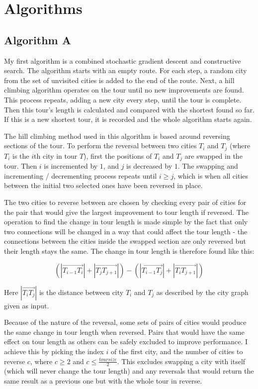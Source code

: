 \documentclass[a4paper,11pt]{article}
\begin{document}
\section{Algorithms}
\subsection{Algorithm A}
My first algorithm is a combined stochastic gradient descent and constructive
search. The algorithm starts with an empty route. For each step, a random city
from the set of unvisited cities is added to the end of the route. Next, a
hill climbing algorithm operates on the tour until no new improvements are
found. This process repeats, adding a new city every step, until the tour is
complete. Then this tour's length is calculated and compared with the shortest
found so far. If this is a new shortest tour, it is recorded and the whole
algorithm starts again.

The hill climbing method used in this algorithm is based around reversing
sections of the tour. To perform the reversal between two cities $T_i$ and
$T_j$ (where $T_i$ is the $i$th city in tour $T$), first the positions of $T_i$
and $T_j$ are swapped in the tour. Then $i$ is incremented by $1$, and $j$ is
decreased by $1$. The swapping and incrementing / decrementing process repeats
until $i \ge j$, which is when all cities between the initial two selected ones
have been reversed in place.

The two cities to reverse between are chosen by checking every pair of cities
for the pair that would give the largest improvement to tour length if
reversed. The operation to find the change in tour length is made simple by the
fact that only two connections will be changed in a way that could affect the
tour length - the connections between the cities inside the swapped section are
only reversed but their length stays the same. The change in tour length is
therefore found like this:

$$(|\overrightarrow{{T_{i-1}}{T_i}}|
+ |\overrightarrow{{T_j}{T_{j+1}}}|)
- (|\overrightarrow{{T_{i-1}}{T_j}}|
+ |\overrightarrow{{T_i}{T_{j+1}}}|)$$

\noindent
Here $|\overrightarrow{{T_i}{T_j}}|$ is the distance between city $T_i$ and
$T_j$ as described by the city graph given as input.

Because of the nature of the reversal, some sets of pairs of cities would 
produce the same change in tour length when reversed. Pairs that would have
the same effect on tour length as others can be safely excluded to improve 
performance. I achieve this by picking the index $i$ of the first city, and the 
number of cities to reverse $c$, where $c \ge 2$ and
$c \le \frac{toursize}{2}$. This excludes swapping a city with itself (which
will never change the tour length) and any reversals that would return the same 
result as a previous one but with the whole tour in reverse.
\end{document}
